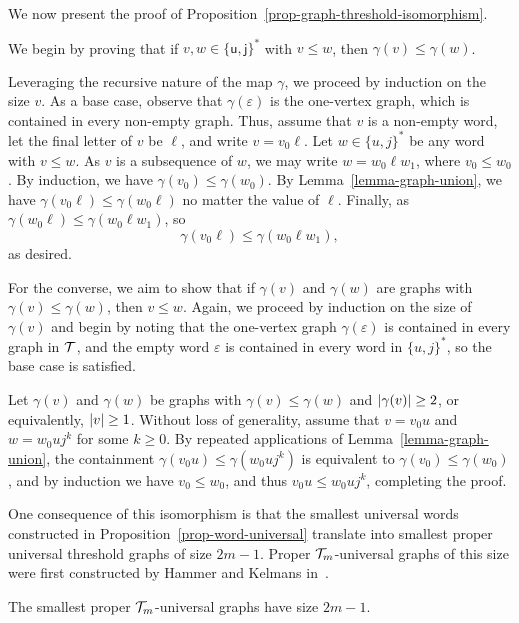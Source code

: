 We now present the proof of Proposition~\ref{prop-graph-threshold-isomorphism}.

\newenvironment{proof-of-prop-graph-threshold-isomorphism}{%
	\medskip\noindent {\it Proof of Proposition~\ref{prop-graph-threshold-isomorphism}.\/}%
}{%
	\qed\bigskip%
}
\begin{proof-of-prop-graph-threshold-isomorphism}
	We begin by proving that if $v, w \in \{\textsf{u}, \textsf{j}\}^\ast$ with $v \le w$, then $\gamma(v) \le \gamma(w)$.

	Leveraging the recursive nature of the map $\gamma$, we proceed by induction on the size $v$. As a base case, observe that $\gamma(\varepsilon)$ is the one-vertex graph, which is contained in every non-empty graph. Thus, assume that $v$ is a non-empty word, let the final letter of $v$ be $\ell$, and write $v = v_0 \ell$. Let $w \in \{u, j\}^\ast$ be any word with $v \le w$. As $v$ is a subsequence of $w$, we may write $w = w_0 \ell w_1$, where $v_0 \le w_0$. By induction, we have $\gamma(v_0) \le \gamma(w_0)$. By Lemma~\ref{lemma-graph-union}, we have $\gamma(v_0\ell) \le \gamma(w_0\ell)$ no matter the value of $\ell$. Finally, as $\gamma(w_0\ell) \le \gamma(w_0\ell w_1)$, so
	\[
		\gamma(v_0\ell) 
		\le 
		\gamma(w_0 \ell w_1),
	\]
	as desired.

	For the converse, we aim to show that if $\gamma(v)$ and $\gamma(w)$ are graphs with $\gamma(v) \le \gamma(w)$, then $v \le w$. Again, we proceed by induction on the size of $\gamma(v)$ and begin by noting that the one-vertex graph $\gamma(\varepsilon)$ is contained in every graph in $\mathcal{T}$, and the empty word $\varepsilon$ is contained in every word in $\{u, j\}^\ast$, so the base case is satisfied. 

	Let $\gamma(v)$ and $\gamma(w)$ be graphs with $\gamma(v) \le \gamma(w)$ and $\left\lvert{\gamma(v)}\right\rvert \ge 2$, or equivalently, $\left\lvert{v}\right\rvert \ge 1$. Without loss of generality, assume that $v = v_0 u$ and $w = w_0 u j^k$ for some $k \ge 0$. By repeated applications of Lemma~\ref{lemma-graph-union}, the containment $\gamma(v_0 u) \le \gamma(w_0 u j^k)$ is equivalent to $\gamma(v_0) \le \gamma(w_0)$, and by induction we have $v_0 \le w_0$, and thus $v_0 u \le w_0 u j^k$, completing the proof.
\end{proof-of-prop-graph-threshold-isomorphism}

One consequence of this isomorphism is that the smallest universal words constructed in Proposition~\ref{prop-word-universal} translate into smallest proper universal threshold graphs of size $2m-1$. Proper $\mathcal{T}_m$-universal graphs of this size were first constructed by Hammer and Kelmans in~\cite{hammer:on-universal-th:}.
\begin{corollary}
\label{cor-graphs-threshold-proper}
	The smallest proper $\mathcal{T}_m$-universal graphs have size $2m-1$.
\end{corollary}

